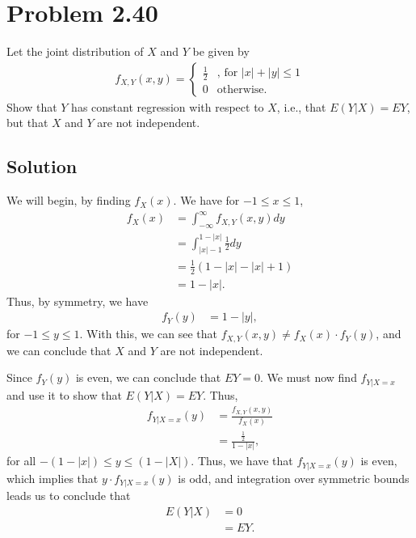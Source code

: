 \documentclass[10pt,a4paper]{article}
\theoremstyle{theorem}
\theoremstyle{definition}
\begin{document}
\section*{Problem 2.40}
Let the joint distribution of $X$ and $Y$  be given by 
\begin{align*}
f_{X,Y}(x, y) = \begin{cases} 
      \frac{1}{2}& \text{, for } |x| + |y| \leq 1 \\
      0 & \text{otherwise.}
   \end{cases}
\end{align*}
Show that $Y$ has constant regression with respect to $X$, i.e., that $E(Y|X) = EY$, but that $X$ and $Y$ are not independent.

\subsection*{Solution}
We will begin, by finding $f_X(x)$.
We have for $-1 \leq x \leq 1$,
\begin{align*}
f_X(x) &= \int_{-\infty}^\infty f_{X,Y}(x, y) dy\\
&= \int_{|x| - 1}^{1 - |x|} \frac{1}{2} dy\\
&= \frac{1}{2}(1 - |x| - |x| + 1)\\
&= 1 - |x|.
\end{align*}
Thus, by symmetry, we have
\begin{align*}
f_Y(y) &= 1 - |y|,
\end{align*}
for $-1 \leq y \leq 1$.  With this, we can see that $f_{X, Y}(x, y) \not = f_X(x) \cdot f_Y(y)$, and we can conclude that $X$ and $Y$ are not independent. 

Since $f_Y(y)$ is even, we can conclude that $EY = 0$. We must now find $f_{Y|X = x}$ and use it to show that $E(Y|X) = EY$. Thus,
\begin{align*}
f_{Y|X = x}(y) &= \frac{f_{X,Y}(x, y)}{f_X(x)}\\
&= \frac{\frac{1}{2}}{1 - |x|},
\end{align*}
for all $-(1 - |x|) \leq y \leq (1 - |X|)$. Thus, we have that $f_{Y|X = x}(y)$ is even, which implies that $y \cdot f_{Y|X = x}(y)$ is odd, and integration over symmetric bounds leads us to conclude that 
\begin{align*}
E(Y|X) &= 0\\
&= EY.
\end{align*}
\end{document}
